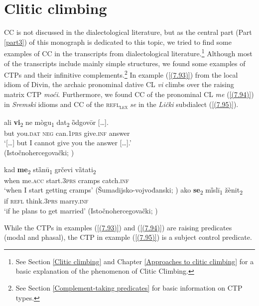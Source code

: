 \section{Clitic climbing}
\label{Clitic climbing:8}
CC is not discussed in the dialectological literature, but as the central part (Part \ref{part3}) of this monograph is dedicated to this topic, we tried to find some examples of CC in the transcripts from dialectological literature.\footnote{See Section \ref{Clitic climbing} and Chapter \ref{Approaches to clitic climbing} for a basic explanation of the phenomenon of Clitic Climbing.} Although most of the transcripts include mainly simple structures, we found some examples of CTPs and their infinitive complements.\footnote{See Section \ref{Complement-taking predicates} for basic information on CTP types.} In example (\ref{(7.93)}) from the local idiom of Divin, the archaic pronominal dative CL \textit{vi} climbs over the raising matrix CTP \textit{moći}. Furthermore, we found CC of the pronominal CL \textit{me} (\ref{(7.94)}) in \textit{Sremski} idioms and CC of the \textsc{refl\textsubscript{lex}} \textit{se} in the \textit{Lički} subdialect (\ref{(7.95)}). 

\begin{exe}\ex\label{(7.93)}
\gll [\dots] ali \textbf{vi}\textsubscript{2}  ne  mògu\textsubscript{1}  dat\textsubscript{2}  ȍdgovōr  [\dots]. \\
{} but you.\textsc{dat} \textsc{neg} can.1\textsc{prs}  give.\textsc{inf}  answer \\
\glt ‘[\dots] but I cannot give you the answer [\dots].’ \\
\hfill  (Istočnohercegovački; \citealt[287]{Peco07a})

\ex\label{(7.94)}
\gll kad  \textbf{me}\textsubscript{2}  stȁnū\textsubscript{1}  grčevi  vȁtati\textsubscript{2}  \\
when me\textsc{.acc} start.\textsc{3prs}  cramps catch.\textsc{inf}  \\
\glt ‘when I start getting cramps’
\hfill  (Šumadijsko-vojvođanski; \citealt[368]{Nikolic64})
\ex\label{(7.95)}
\gll ako   \textbf{se}\textsubscript{2} mȉslī\textsubscript{1}  žènit\textsubscript{2} \\
if \textsc{refl}  think.\textsc{3prs}  marry.\textsc{inf}  \\
\glt ‘if he plans to get married’
\hfill  (Istočnohercegovački; \citealt[90]{Okuka08})
\end{exe}

\noindent While the CTPs in examples (\ref{(7.93)}) and (\ref{(7.94)}) are raising predicates (modal and phasal), the CTP in example (\ref{(7.95)}) is a subject control predicate. 

